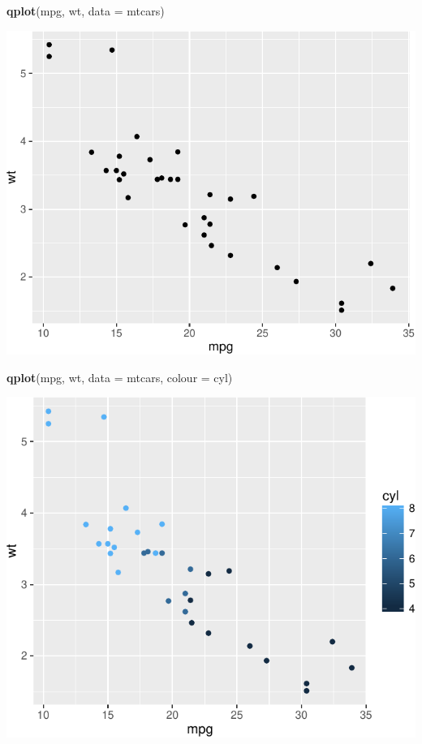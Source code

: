 \documentclass[]{article}
\newenvironment{Shaded}{\begin{snugshade}}{\end{snugshade}}
\newcommand{\KeywordTok}[1]{\textcolor[rgb]{0.13,0.29,0.53}{\textbf{{#1}}}}
\newcommand{\DataTypeTok}[1]{\textcolor[rgb]{0.13,0.29,0.53}{{#1}}}
\newcommand{\NormalTok}[1]{{#1}}
\numberwithin{equation}{section}
\begin{document}
\begin{Shaded}
\begin{Highlighting}[]
\KeywordTok{qplot}\NormalTok{(mpg, wt, }\DataTypeTok{data =} \NormalTok{mtcars)}
\end{Highlighting}
\end{Shaded}

\includegraphics{index_files/figure-latex/unnamed-chunk-235-2.pdf}

\begin{Shaded}
\begin{Highlighting}[]
\KeywordTok{qplot}\NormalTok{(mpg, wt, }\DataTypeTok{data =} \NormalTok{mtcars, }\DataTypeTok{colour =} \NormalTok{cyl)}
\end{Highlighting}
\end{Shaded}

\includegraphics{index_files/figure-latex/unnamed-chunk-235-3.pdf}
\end{document}
